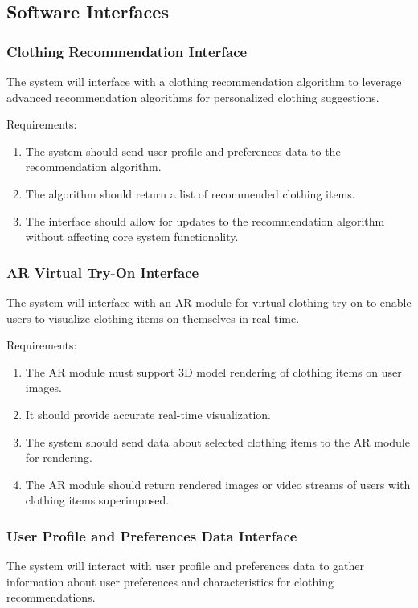 	\subsection{Software Interfaces}
		\subsubsection{Clothing Recommendation Interface}
			The system will interface with a clothing recommendation algorithm to leverage advanced recommendation algorithms for personalized clothing suggestions.

			Requirements:
			\begin{enumerate}
				\item The system should send user profile and preferences data to the recommendation algorithm.
				\item The algorithm should return a list of recommended clothing items.
				\item The interface should allow for updates to the recommendation algorithm without affecting core system functionality.
			\end{enumerate}
		
		\subsubsection{AR Virtual Try-On Interface}
			The system will interface with an AR module for virtual clothing try-on to enable users to visualize clothing items on themselves in real-time.

			Requirements:
			\begin{enumerate}
				\item The AR module must support 3D model rendering of clothing items on user images.
				\item It should provide accurate real-time visualization.
				\item The system should send data about selected clothing items to the AR module for rendering.
				\item The AR module should return rendered images or video streams of users with clothing items superimposed.
			\end{enumerate}

		\subsubsection{User Profile and Preferences Data Interface}
			The system will interact with user profile and preferences data to gather information about user preferences and characteristics for clothing recommendations.

